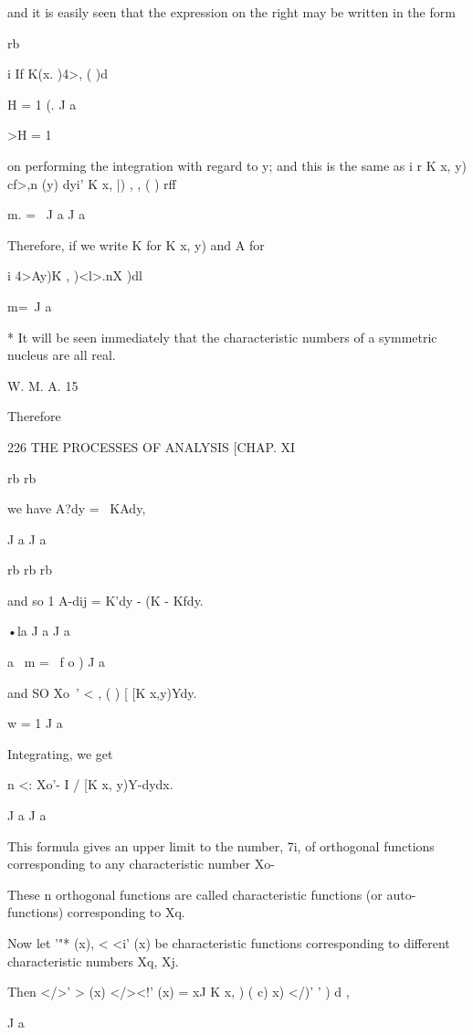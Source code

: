 {and it is easily seen that the expression on the right may be written
in the form

rb



i If K(x. )4>, ( )d

H = 1 (. J a



>H = 1

on performing the integration with regard to y; and this is the same
as i r K x, y) cf>,n (y) dyi' K x, |) , , ( ) rff

m. = \ J a J a

Therefore, if we write K for K x, y) and A for

i 4>Ay)\' K , )<l>.nX )dl

m=\ J a



* It will be seen immediately that the characteristic numbers of a
symmetric nucleus are all real.

W. M. A. 15



Therefore



226 THE PROCESSES OF ANALYSIS [CHAP. XI

rb rb

we have A?dy = \ KAdy,

J a J a

rb rb rb

and so 1 A-dij = K'dy - (K - Kfdy.

•la J a J a

a \ m = \ f o ) J a

and SO Xo~' < , ( ) [ [K x,y)Ydy.

w = 1 J a

Integrating, we get

n <: Xo'- I / [K x, y)Y-dydx.

J a J a

This formula gives an upper limit to the number, 7i, of orthogonal
functions corresponding to any characteristic number Xo-

These n orthogonal functions are called characteristic functions (or
auto- functions) corresponding to Xq.

Now let '"* (x), < <i' (x) be characteristic functions corresponding
to different characteristic numbers Xq, Xj.

Then </>' > (x) </><!' (x) = xJ K x, ) ( c) x) </)' ' ) d ,

J a

}
